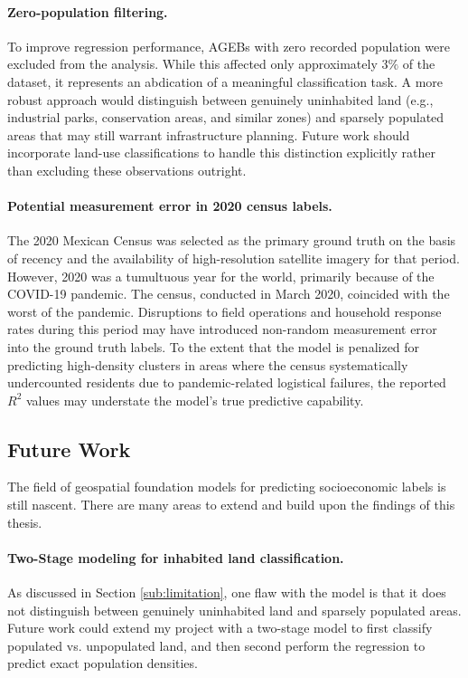 \documentclass[12pt,letterpaper]{article}
\begin{document}
\paragraph{Zero-population filtering.}
To improve regression performance, AGEBs with zero recorded population were excluded from the analysis. While this affected only approximately $3\%$ of the dataset, it represents an abdication of a meaningful classification task. A more robust approach would distinguish between genuinely uninhabited land (e.g., industrial parks, conservation areas, and similar zones) and sparsely populated areas that may still warrant infrastructure planning. Future work should incorporate land-use classifications to handle this distinction explicitly rather than excluding these observations outright.

\paragraph{Potential measurement error in 2020 census labels.}
The 2020 Mexican Census was selected as the primary ground truth on the basis of recency and the availability of high-resolution satellite imagery for that period. However, 2020 was a tumultuous year for the world, primarily because of the COVID-19 pandemic. The census, conducted in March 2020, coincided with the worst of the pandemic. Disruptions to field operations and household response rates during this period may have introduced non-random measurement error into the ground truth labels. To the extent that the model is penalized for predicting high-density clusters in areas where the census systematically undercounted residents due to pandemic-related logistical failures, the reported $R^2$ values may understate the model's true predictive capability.


\subsection{Future Work}

The field of geospatial foundation models for predicting socioeconomic labels is still nascent. There are many areas to extend and build upon the findings of this thesis.

\paragraph{Two-Stage modeling for inhabited land classification.} As discussed in Section \ref{sub:limitation}, one flaw with the model is that it does not distinguish between genuinely uninhabited land and sparsely populated areas. Future work could extend my project with a two-stage model to first classify populated vs. unpopulated land, and then second perform the regression to predict exact population densities. 
\end{document}
